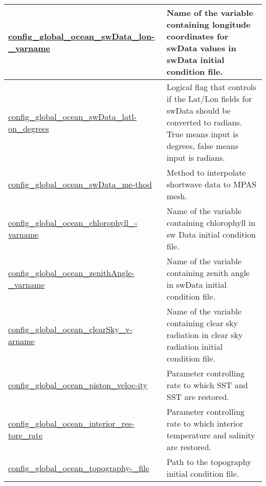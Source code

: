 {\begin{center}
\begin{longtable}{| p{2.0in} || p{4.0in} |}
    \hline
    \hyperref[subsec:nm_sec_config_global_ocean_swData_lon_varname]{config\_global\_ocean\_swData\_lon-}\hyperref[subsec:nm_sec_config_global_ocean_swData_lon_varname]{\_varname}& Name of the variable containing longitude coordinates for swData values in swData initial condition file. \\
    \hline
    \hyperref[subsec:nm_sec_config_global_ocean_swData_latlon_degrees]{config\_global\_ocean\_swData\_latl-}\hyperref[subsec:nm_sec_config_global_ocean_swData_latlon_degrees]{on\_degrees}& Logical flag that controls if the Lat/Lon fields for swData should be converted to radians. True means input is degrees, false means input is radians. \\
    \hline
    \hyperref[subsec:nm_sec_config_global_ocean_swData_method]{config\_global\_ocean\_swData\_me-}\hyperref[subsec:nm_sec_config_global_ocean_swData_method]{thod}& Method to interpolate shortwave data to MPAS mesh. \\
    \hline
    \hyperref[subsec:nm_sec_config_global_ocean_chlorophyll_varname]{config\_global\_ocean\_chlorophyll\_-}\hyperref[subsec:nm_sec_config_global_ocean_chlorophyll_varname]{varname}& Name of the variable containing chlorophyll in sw Data initial condition file. \\
    \hline
    \hyperref[subsec:nm_sec_config_global_ocean_zenithAngle_varname]{config\_global\_ocean\_zenithAngle-}\hyperref[subsec:nm_sec_config_global_ocean_zenithAngle_varname]{\_varname}& Name of the variable containing zenith angle in swData initial condition file. \\
    \hline
    \hyperref[subsec:nm_sec_config_global_ocean_clearSky_varname]{config\_global\_ocean\_clearSky\_v-}\hyperref[subsec:nm_sec_config_global_ocean_clearSky_varname]{arname}& Name of the variable containing clear sky radiation in clear sky radiation initial condition file. \\
    \hline
    \hyperref[subsec:nm_sec_config_global_ocean_piston_velocity]{config\_global\_ocean\_piston\_veloc-}\hyperref[subsec:nm_sec_config_global_ocean_piston_velocity]{ity}& Parameter controlling rate to which SST and SST are restored. \\
    \hline
    \hyperref[subsec:nm_sec_config_global_ocean_interior_restore_rate]{config\_global\_ocean\_interior\_res-}\hyperref[subsec:nm_sec_config_global_ocean_interior_restore_rate]{tore\_rate}& Parameter controlling rate to which interior temperature and salinity are restored. \\
    \hline
    \hyperref[subsec:nm_sec_config_global_ocean_topography_file]{config\_global\_ocean\_topography-}\hyperref[subsec:nm_sec_config_global_ocean_topography_file]{\_file}& Path to the topography initial condition file. \\

\end{longtable}
\end{center}}
